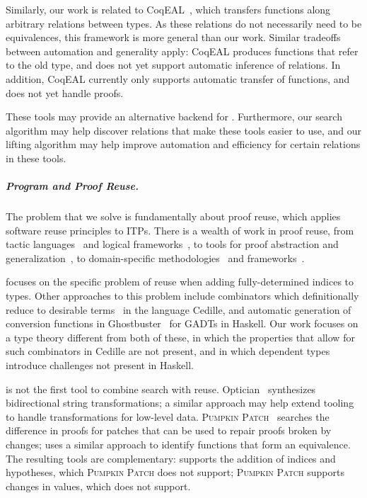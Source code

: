 Similarly, our work is related to CoqEAL~\cite{cohen:hal-01414881}, which transfers functions along arbitrary relations
between types. As these relations do not necessarily need to be equivalences, this framework is more general
than our work. Similar tradeoffs between automation and generality apply: CoqEAL produces functions that refer to the old type,
and does not yet support automatic inference of relations. In addition, CoqEAL currently only supports automatic transfer of functions,
and does not yet handle proofs.

These tools may provide an alternative backend for \toolnameb. Furthermore,
our search algorithm may help discover relations that make these tools easier to use,
and our lifting algorithm may help improve automation and efficiency for 
certain relations in these tools.

\subparagraph*{Program and Proof Reuse.}
The problem that we solve is fundamentally about proof reuse,
which applies software reuse principles to ITPs. 
There is a wealth of work in proof reuse, from tactic languages~\cite{felty1994generalization} and logical frameworks~\cite{caplan1995logical},
to tools for proof abstraction and generalization~\cite{pons2000generalization, johnsen2004theorem},
to domain-specific methodologies~\cite{Delaware:2011:PLT:2048066.2048113} and frameworks~\cite{Delaware:2013:MLC:2429069.2429094}.

\toolnameb focuses on the specific problem of reuse
when adding fully-determined indices to types.
Other approaches to this problem include combinators which definitionally reduce to desirable terms~\cite{DBLP:journals/corr/abs-1803-08150} in the language Cedille,
and automatic generation of conversion functions in Ghostbuster~\cite{McDonell:2016:GTS:2951913.2951914} for GADTs in Haskell.
Our work focuses on a type theory different from both of these, in which the properties that allow for such combinators in Cedille are not present, and in which dependent types introduce challenges not present in Haskell.

\toolnameb is not the first tool to combine search with reuse. 
Optician~\cite{miltner2017synthesizing} synthesizes bidirectional string transformations;
a similar approach may help extend tooling to handle transformations for low-level data.
\textsc{Pumpkin Patch}~\cite{ringer2018adapting} 
searches the difference in proofs for patches that can be used to repair proofs broken by changes;
\toolnameb uses a similar approach to identify functions
that form an equivalence. The resulting tools are complementary: \toolnameb supports the addition
of indices and hypotheses, which \textsc{Pumpkin Patch} does not support; \textsc{Pumpkin Patch} supports changes
in values, which \toolnameb does not support. 

